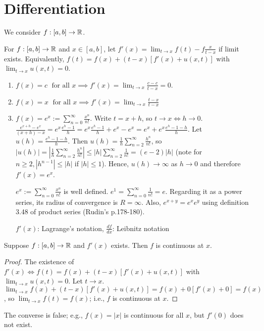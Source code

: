 \chapter{Differentiation}
We consider $f:[a,b]\to \mathbb{R}$.

\begin{definition}
	For $f: [a,b]\to \mathbb{R}$ and $x \in [a,b]$, let $f'(x)=\lim_{t\to x}{f(t)-f\frac{x}{t-x}}$ if limit exists.
	Equivalently, $f(t)=f(x)+(t-x)[f'(x)+u(x,t)]$ with $\lim_{t\to x}{u(x,t)}=0$.
\end{definition}

\begin{example}
	\begin{enumerate}[label=(\alph*)]
		\item $f(x)=c \; \text{ for all } x \implies f'(x)=\lim_{t\to x}{\frac{c-c}{t-x}}=0$.
		\item $f(x)=x\; \text{ for all }x\implies f'(x)=\lim_{t\to x}{\frac{t-x}{t-x}}$
		\item $f(x)=e^{x}:=\sum_{n=0}^{\infty}{\frac{x^{n}}{n!}}$.
		      Write $t=x+h$, so $t\to x \Leftrightarrow h\to 0$.
		      $\frac{e^{x+h}-e^{x}}{(x+h)-x}=e^{x}\frac{e^{h}-1}{h}=e^{x}\frac{e^{h}-1}{h}+e^{x}-e^{x}=e^{x}+e^{x}\frac{e^{h}-1-h}{h}$.
		      Let $u(h)=\frac{e^{h}-1-h}{h}$. Then $u(h)=\frac{1}{h}\sum_{n=2}^{\infty}{\frac{h^{n}}{n!}}$, so $|u(h)|=|\frac{1}{h}\sum_{n=2}^{\infty}{\frac{h^{n}}{n!}}|\le |h| \sum_{n=2}^{\infty}{\frac{1}{n!}}=(e-2)|h|$ (note for $n\ge 2, |h^{n-1}|\le |h|$ if $|h|\le 1$). Hence, $u(h)\to \infty$ as $h\to 0$ and therefore $f'(x)=e^{x}$.
		      \begin{remark}
			      $e^{x}:=\sum_{n=0}^{\infty}{\frac{x^{n}}{n!}}$ is well defined.
			      $e^{1}=\sum_{n=0}^{\infty}{\frac{1}{n!}}=e$. Regarding it as a power series, its radius of convergence is $R=\infty$. Also, $e^{x+y}=e^{x}e^{y}$ using definition 3.48 of product series (Rudin's p.178-180).
		      \end{remark}
		      \begin{note}
			      $f'(x)$: Lagrange's notation, $\frac{df}{dx}$: Leibnitz notation
		      \end{note}
	\end{enumerate}
\end{example}

\begin{thm}[2]
	Suppose $f:[a,b]\to \mathbb{R}$ and $f'(x)$ exists. Then $f$ is continuous at $x$.
	\begin{proof}
		The existence of $f'(x) \Leftrightarrow f(t)=f(x)+(t-x)[f'(x)+u(x,t)]$ with $\lim_{t\to x}{u(x,t)}=0$. Let $t\to x$. $\lim_{t\to x}{f(x)+(t-x)[f'(x)+u(x,t)]}=f(x)+0[f'(x)+0]=f(x)$, so $\lim_{t\to x}{f(t)}=f(x)$; i.e., $f$ is continuous at $x$.
	\end{proof}
	\begin{remark}
		The converse is false; e.g., $f(x)=|x|$ is continuous for all $x$, but $f'(0)$ does not exist.
	\end{remark}
\end{thm}

